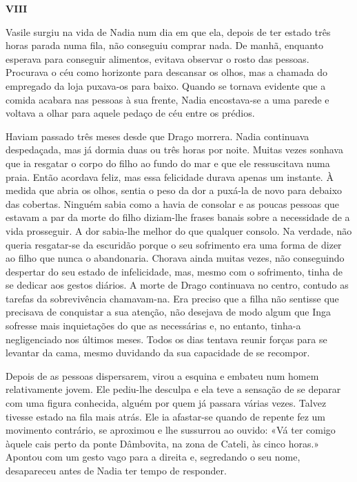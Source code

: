 \pagebreak
\vspace*{1.8cm}
\noindent{}\textbf{VIII}

\bigskip

Vasile surgiu na vida de Nadia num dia em que ela, depois de ter estado
três horas parada numa fila, não conseguiu comprar nada. De manhã,
enquanto esperava para conseguir alimentos, evitava observar o rosto das
pessoas. Procurava o céu como horizonte para descansar os olhos, mas a
chamada do empregado da loja puxava-os para baixo. Quando se tornava
evidente que a comida acabara nas pessoas à sua frente, Nadia
encostava-se a uma parede e voltava a olhar para aquele pedaço de céu
entre os prédios.

Haviam passado três meses desde que Drago morrera. Nadia continuava
despedaçada, mas já dormia duas ou três horas por noite. Muitas vezes
sonhava que ia resgatar o corpo do filho ao fundo do mar e que ele
ressuscitava numa praia. Então acordava feliz, mas essa felicidade
durava apenas um instante. À medida que abria os olhos, sentia o peso da
dor a puxá-la de novo para debaixo das cobertas. Ninguém sabia como a
havia de consolar e as poucas pessoas que estavam a par da morte do
filho diziam-lhe frases banais sobre a necessidade de a vida
prosseguir. A dor sabia-lhe melhor do que qualquer consolo. Na
verdade, não queria resgatar-se da escuridão porque o seu sofrimento era
uma forma de dizer ao filho que nunca o abandonaria. Chorava ainda
muitas vezes, não conseguindo despertar do seu estado de infelicidade,
mas, mesmo com o sofrimento, tinha de se dedicar aos gestos diários. A
morte de Drago continuava no centro, contudo as tarefas da sobrevivência
chamavam-na. Era preciso que a filha não sentisse que precisava de
conquistar a sua atenção, não desejava de modo algum que Inga sofresse
mais inquietações do que as necessárias e, no entanto, tinha-a
negligenciado nos últimos meses. Todos os dias tentava reunir forças
para se levantar da cama, mesmo duvidando da sua capacidade de se
recompor.

Depois de as pessoas dispersarem, virou a esquina e
embateu num homem relativamente jovem. Ele pediu-lhe desculpa e ela teve
a sensação de se deparar com uma figura conhecida, alguém por quem já
passara várias vezes. Talvez tivesse estado na fila mais atrás. Ele ia
afastar-se quando de repente fez um movimento contrário, se aproximou
e lhe sussurrou ao ouvido: «Vá ter comigo àquele cais perto da ponte
Dâmbovita, na zona de Cateli, às cinco horas.» Apontou com um gesto vago
para a direita e, segredando o seu nome, desapareceu antes de Nadia ter
tempo de responder.

